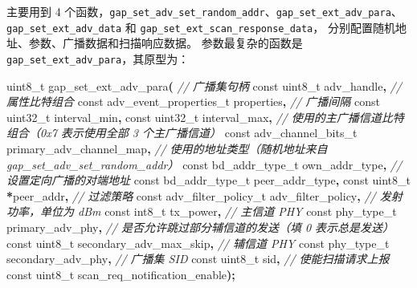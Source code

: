 \documentclass[
  12pt,
]{book}
\newenvironment{Shaded}{\begin{snugshade}}{\end{snugshade}}
\newcommand{\CommentTok}[1]{\textcolor[rgb]{0.56,0.35,0.01}{\textit{#1}}}
\newcommand{\DataTypeTok}[1]{\textcolor[rgb]{0.13,0.29,0.53}{#1}}
\newcommand{\NormalTok}[1]{#1}
\newcommand{\OperatorTok}[1]{\textcolor[rgb]{0.81,0.36,0.00}{\textbf{#1}}}
\begin{document}
主要用到 4 个函数，\texttt{gap\_set\_adv\_set\_random\_addr}、\texttt{gap\_set\_ext\_adv\_para}、\texttt{gap\_set\_ext\_adv\_data} 和 \texttt{gap\_set\_ext\_scan\_response\_data}，
分别配置随机地址、参数、广播数据和扫描响应数据。
参数最复杂的函数是 \texttt{gap\_set\_ext\_adv\_para}，其原型为：

\begin{Shaded}
\begin{Highlighting}[]
\DataTypeTok{uint8\_t}\NormalTok{ gap\_set\_ext\_adv\_para}\OperatorTok{(}
    \CommentTok{// 广播集句柄}
    \DataTypeTok{const} \DataTypeTok{uint8\_t}\NormalTok{ adv\_handle}\OperatorTok{,}
    \CommentTok{// 属性比特组合}
    \DataTypeTok{const}\NormalTok{ adv\_event\_properties\_t properties}\OperatorTok{,}
    \CommentTok{// 广播间隔}
    \DataTypeTok{const} \DataTypeTok{uint32\_t}\NormalTok{ interval\_min}\OperatorTok{,}
    \DataTypeTok{const} \DataTypeTok{uint32\_t}\NormalTok{ interval\_max}\OperatorTok{,}
    \CommentTok{// 使用的主广播信道比特组合（0x7 表示使用全部 3 个主广播信道）}
    \DataTypeTok{const}\NormalTok{ adv\_channel\_bits\_t primary\_adv\_channel\_map}\OperatorTok{,}
    \CommentTok{// 使用的地址类型（随机地址来自 gap\_set\_adv\_set\_random\_addr）}
    \DataTypeTok{const}\NormalTok{ bd\_addr\_type\_t own\_addr\_type}\OperatorTok{,}
    \CommentTok{// 设置定向广播的对端地址}
    \DataTypeTok{const}\NormalTok{ bd\_addr\_type\_t peer\_addr\_type}\OperatorTok{,}
    \DataTypeTok{const} \DataTypeTok{uint8\_t} \OperatorTok{*}\NormalTok{peer\_addr}\OperatorTok{,}
    \CommentTok{// 过滤策略}
    \DataTypeTok{const}\NormalTok{ adv\_filter\_policy\_t adv\_filter\_policy}\OperatorTok{,}
    \CommentTok{// 发射功率，单位为 dBm}
    \DataTypeTok{const} \DataTypeTok{int8\_t}\NormalTok{ tx\_power}\OperatorTok{,}
    \CommentTok{// 主信道 PHY}
    \DataTypeTok{const}\NormalTok{ phy\_type\_t primary\_adv\_phy}\OperatorTok{,}
    \CommentTok{// 是否允许跳过部分辅信道的发送（填 0 表示总是发送）}
    \DataTypeTok{const} \DataTypeTok{uint8\_t}\NormalTok{ secondary\_adv\_max\_skip}\OperatorTok{,}
    \CommentTok{// 辅信道 PHY}
    \DataTypeTok{const}\NormalTok{ phy\_type\_t secondary\_adv\_phy}\OperatorTok{,}
    \CommentTok{// 广播集 SID}
    \DataTypeTok{const} \DataTypeTok{uint8\_t}\NormalTok{ sid}\OperatorTok{,}
    \CommentTok{// 使能扫描请求上报}
    \DataTypeTok{const} \DataTypeTok{uint8\_t}\NormalTok{ scan\_req\_notification\_enable}\OperatorTok{);}
\end{Highlighting}
\end{Shaded}
\end{document}
